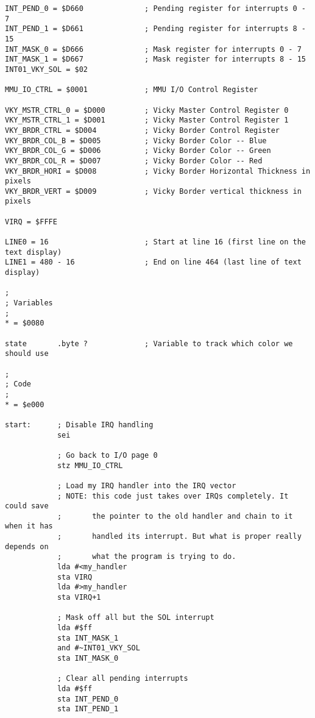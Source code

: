 \begin{verbatim}
INT_PEND_0 = $D660              ; Pending register for interrupts 0 - 7
INT_PEND_1 = $D661              ; Pending register for interrupts 8 - 15
INT_MASK_0 = $D666              ; Mask register for interrupts 0 - 7
INT_MASK_1 = $D667              ; Mask register for interrupts 8 - 15
INT01_VKY_SOL = $02

MMU_IO_CTRL = $0001             ; MMU I/O Control Register

VKY_MSTR_CTRL_0 = $D000         ; Vicky Master Control Register 0
VKY_MSTR_CTRL_1 = $D001         ; Vicky Master Control Register 1
VKY_BRDR_CTRL = $D004           ; Vicky Border Control Register
VKY_BRDR_COL_B = $D005          ; Vicky Border Color -- Blue
VKY_BRDR_COL_G = $D006          ; Vicky Border Color -- Green
VKY_BRDR_COL_R = $D007          ; Vicky Border Color -- Red
VKY_BRDR_HORI = $D008           ; Vicky Border Horizontal Thickness in pixels
VKY_BRDR_VERT = $D009           ; Vicky Border vertical thickness in pixels

VIRQ = $FFFE

LINE0 = 16                      ; Start at line 16 (first line on the text display)
LINE1 = 480 - 16                ; End on line 464 (last line of text display)

;
; Variables
;
* = $0080

state       .byte ?             ; Variable to track which color we should use

;
; Code
;
* = $e000

start:      ; Disable IRQ handling
            sei

            ; Go back to I/O page 0
            stz MMU_IO_CTRL

            ; Load my IRQ handler into the IRQ vector
            ; NOTE: this code just takes over IRQs completely. It could save
            ;       the pointer to the old handler and chain to it when it has
            ;       handled its interrupt. But what is proper really depends on
            ;       what the program is trying to do.
            lda #<my_handler
            sta VIRQ
            lda #>my_handler
            sta VIRQ+1

            ; Mask off all but the SOL interrupt
            lda #$ff
            sta INT_MASK_1
            and #~INT01_VKY_SOL
            sta INT_MASK_0

            ; Clear all pending interrupts
            lda #$ff
            sta INT_PEND_0
            sta INT_PEND_1


\end{verbatim}
